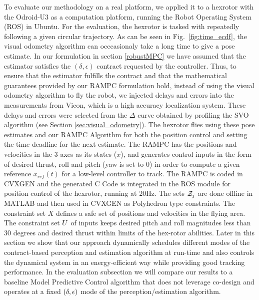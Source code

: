 To evaluate our methodology on a real platform, we applied it to a hexrotor with the Odroid-U3 as a computation platform, running the Robot Operating System (ROS) \cite{ROS288} in Ubuntu. For the evaluation, the hexrotor is tasked with repeatedly following a given circular trajectory.
As can be seen in Fig.~\ref{fig:time_ecdf}, the visual odometry algorithm can occcasionaly take a long time to give a pose estimate. In our formulation in section \ref{robustMPC} we have assumed that the estimator satisfies the $(\delta, \epsilon)$ contract requested by the controller. Thus, to ensure that the estimator fulfills the contract and that the mathematical guarantees provided by our RAMPC formulation hold, instead of using the visual odometry algorithm to fly the robot, 
we injected delays and errors into the measurements from Vicon, which is a high accuracy localization system. 
These delays and errors were selected from the $\Delta$ curve obtained by profiling the SVO algorithm (see Section \ref{sec:visual_odometry}).
The hexrotor flies using these pose estimates and our RAMPC Algorithm for both the position control and setting the time deadline for the next estimate. 
The RAMPC has the positions and velocities in the 3-axes as its states ($x$), and generates control inputs in the form of desired thrust, roll and pitch (yaw is set to 0) in order to compute a given reference $x_{ref}(t)$ for a low-level controller to track. 
The RAMPC is coded in CVXGEN \cite{cvxgen} and the generated C Code is integrated in the ROS module for position control of the hexrotor, running at 20Hz. 
The sets $\mathcal{Z}_j$ are done offline in MATLAB and then used in CVXGEN as Polyhedron type constraints. 
The constraint set $X$ defines a safe set of positions and velocities in the flying area. 
The constraint set $U$ of inputs keeps desired pitch and roll magnitudes less than $30$ degrees and desired thrust within limits of the hex-rotor abilities.
Later in this section we show that our approach dynamically schedules different modes of the contract-based perception and estimation algorithm at run-time and also controls the dynamical system in an energy-efficient way while providing good tracking performance. 
In the evaluation subsection we will compare our results to a baseline Model Predictive Control algorithm that does not leverage co-design and operates at a fixed $(\delta,\epsilon)$ mode of the perception/estimation algorithm.

